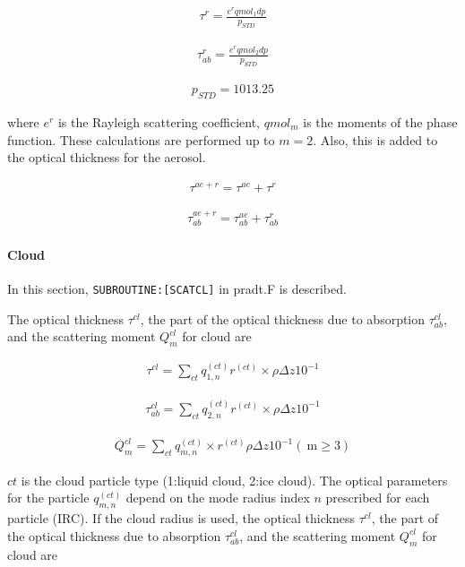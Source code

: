 \begin{eqnarray}
\tau^{r}=\frac{e^{r}qmol_{1}dp}{p_{S T D}}
\end{eqnarray}

\begin{eqnarray}
\tau_{ab}^{r}=\frac{e^{r}qmol_{2}dp}{p_{S T D}}
\end{eqnarray}

\begin{eqnarray}
p_{S T D}=1013.25
\end{eqnarray}

where \(e^{r}\) is the Rayleigh scattering coefficient, \(qmol_m\) is
the moments of the phase function. These calculations are performed up
to \(m=2\). Also, this is added to the optical thickness for the
aerosol.

\begin{eqnarray}
\tau^{a e+r}=\tau^{a e}+\tau^{r}
\end{eqnarray}

\begin{eqnarray}
\tau_{ab}^{a e+r}=\tau_{ab}^{a e}+\tau_{ab}^{r}
\end{eqnarray}

\hypertarget{cloud}{%
\paragraph{Cloud}\label{cloud}}

In this section, \texttt{SUBROUTINE:{[}SCATCL{]}} in pradt.F is
described.

The optical thickness \(\tau^{cl}\), the part of the optical thickness
due to absorption \(\tau_{ab}^{cl}\), and the scattering moment
\(Q_{m}^{c l}\) for cloud are

\begin{eqnarray}
\tau^{c l}=\sum_{c t} q_{1, n}^{(c t)}r^{(c t)}\times \rho \Delta z 10^{-1}
\end{eqnarray}

\begin{eqnarray}
\tau_{ab}^{c l}=\sum_{c t} q_{2, n}^{(c t)}r^{(c t)}\times \rho \Delta z 10^{-1}
\end{eqnarray}

\begin{eqnarray}
Q_{m}^{c l}=\sum_{c t} q_{m, n}^{(c t)} \times r^{(c t)} \rho \Delta z 10^{-1}(\mathrm{~m} \geq 3)
\end{eqnarray}

\(ct\) is the cloud particle type (1:liquid cloud, 2:ice cloud). The
optical parameters for the particle \(q_{m, n}^{(c t)}\) depend on the
mode radius index \(n\) prescribed for each particle (IRC). If the cloud
radius is used, the optical thickness \(\tau^{cl}\), the part of the
optical thickness due to absorption \(\tau_{ab}^{cl}\), and the
scattering moment \(Q_{m}^{c l}\) for cloud are

